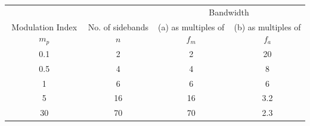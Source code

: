 \documentclass[11pt]{article} %
\begin{document}
\begin{table}[h]
    \begin{tabular}{|c|c|c|c|}
        \hline
 & & \multicolumn{2}{c}{Bandwidth} \\
Modulation Index $m_p$ & No. of sidebands $n$ &  (a) as multiples of $f_m$ & (b) as multiples of $f_a$ \\ \hline
	0.1 &  2 & 2 & 20 \\
	0.5 & 4 & 4 & 8 \\
	1 & 6 & 6 & 6 \\
	5 & 16 & 16 & 3.2 \\
	30 & 70 & 70 &2.3 \\
    \end{tabular}
\end{table}
\end{document}
